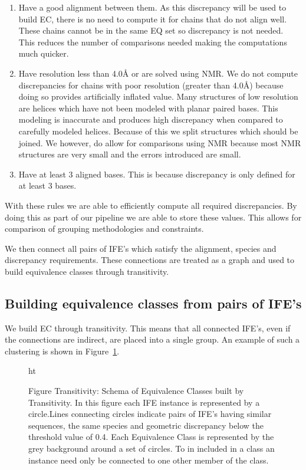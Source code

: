 \begin{enumerate}
  \item Have a good alignment between them. As this discrepancy will be used to
    build EC, there is no need to compute it for chains that do not align well.
    These chains cannot be in the same EQ set so discrepancy is not needed. This
    reduces the number of comparisons needed making the computations much
    quicker.

  \item Have resolution less than 4.0Å or are solved using NMR. We do not
    compute discrepancies for chains with poor resolution (greater than 4.0Å)
    because doing so provides artificially inflated value. Many structures of
    low resolution are helices which have not been modeled with planar paired
    bases. This modeling is inaccurate and produces high discrepancy when
    compared to carefully modeled helices. Because of this we split structures
    which should be joined. We however, do allow for comparisons using NMR
    because most NMR structures are very small and the errors introduced are
    small.

  \item Have at least 3 aligned bases. This is because discrepancy is only
    defined for at least 3 bases.

\end{enumerate}

With these rules we are able to efficiently compute all required discrepancies.
By doing this as part of our pipeline we are able to store these values. This
allows for comparison of grouping methodologies and constraints. 

We then connect all pairs of IFE’s which satisfy the alignment, species and
discrepancy requirements. These connections are treated as a graph and used to
build equivalence classes through transitivity.

\subsection{Building equivalence classes from pairs of IFE’s}

We build EC through transitivity. This means that all connected IFE’s, even if
the connections are indirect, are placed into a single group. An example of such
a clustering is shown in Figure~\ref{fig:transitivity}. 

\begin{figure}{ht}
  \caption{Figure Transitivity: Schema of Equivalence Classes built by
    Transitivity. In this figure each IFE instance is represented by a
    circle.Lines connecting circles indicate pairs of IFE's having similar
    sequences, the same species and geometric discrepancy below the threshold
    value of 0.4. Each Equivalence Class is represented by the grey background
    around a set of circles. To in included in a class an instance need only be
  connected to one other member of the class.}
  \label{fig:transitivity}
\end{figure}

